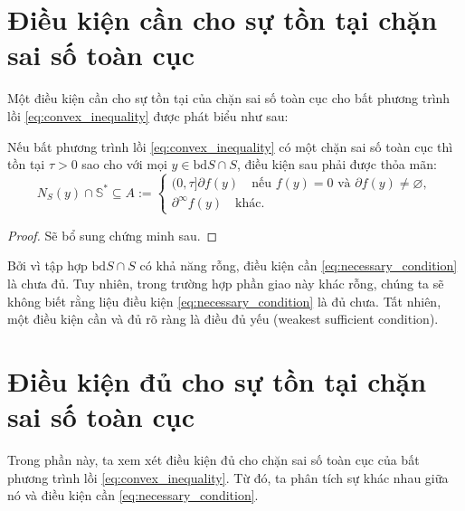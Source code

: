 \section{Điều kiện cần cho sự tồn tại chặn sai số toàn cục}

Một điều kiện cần cho sự tồn tại của chặn sai số toàn cục cho bất phương trình lồi \eqref{eq:convex_inequality} được phát biểu như sau:
\begin{prop}
    \label{prop:necessary_criterion}
    Nếu bất phương trình lồi \eqref{eq:convex_inequality} có một chặn sai số toàn cục thì tồn tại $\tau > 0$ sao cho với mọi $y \in \text{bd} S \cap S$, điều kiện sau phải được thỏa mãn:
    \begin{equation}
        \label{eq:necessary_condition}
        N_S(y) \cap \mathbb{S}^{*} \subseteq A := \begin{cases}
            (0, \tau]\partial f(y)\quad\text{nếu } f(y)= 0 \text{ và } \partial f(y) \ne \varnothing, \\
            \partial^{\infty}f(y)\quad\text{khác.}
        \end{cases}
    \end{equation}
\end{prop}
\begin{proof}
    Sẽ bổ sung chứng minh sau.
\end{proof}

Bởi vì tập hợp $\text{bd} S \cap S$ có khả năng rỗng, điều kiện cần \eqref{eq:necessary_condition} là chưa đủ. Tuy nhiên, trong trường hợp phần giao này khác rỗng, chúng ta sẽ không biết rằng liệu điều kiện \eqref{eq:necessary_condition} là đủ chưa. Tất nhiên, một điều kiện cần và đủ rõ ràng là điều đủ yếu (weakest sufficient condition).

\section{Điều kiện đủ cho sự tồn tại chặn sai số toàn cục}

Trong phần này, ta xem xét điều kiện đủ cho chặn sai số toàn cục của bất phương trình lồi \eqref{eq:convex_inequality}. Từ đó, ta phân tích sự khác nhau giữa nó và điều kiện cần \eqref{eq:necessary_condition}.

